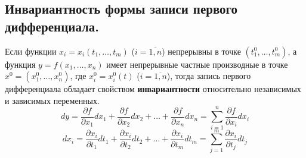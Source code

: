 \documentclass[12pt]{article}
\begin{document}
    \subsection{Инвариантность формы записи первого дифференциала.}\noindent
    Если функции $x_i = x_i(t_1, \dots, t_m)$ ($i = \overline{1,n}$) непрерывны в точке $(t^0_1, \dots, t^0_m)$, а функция $y = f(x_1, \dots, x_n)$ имеет непрерывные частные производные в точке $x^0 = (x^0_1, \dots, x^0_n)$, где $x^0_i = x^0_i(t)$ ($i = \overline{1,n}$), тогда запись первого дифференциала обладает свойством \textbf{инвариантности} относительно независимых и зависимых переменных.
    \[ dy = \frac{\partial f}{\partial x_1}dx_1 + \frac{\partial f}{\partial x_2}dx_2 + \dots + \frac{\partial f}{\partial x_n}dx_n = \sum_{i=1}^{n}\frac{\partial f}{\partial x_i}dx_i \]
    \[ dx_i = \frac{\partial x_i}{\partial t_1}dt_1 + \frac{\partial x_i}{\partial t_2}dt_2 + \dots + \frac{\partial x_i}{\partial t_m}dt_m = \sum_{j=1}^{m} \frac{\partial x_i}{\partial t_j}dt_j \]
\end{document}
